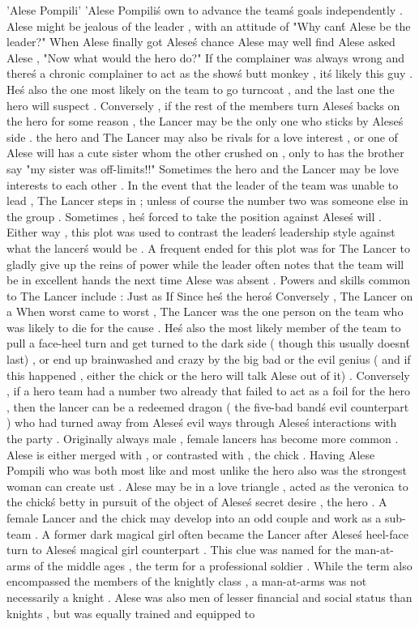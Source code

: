 'Alese Pompili'
'Alese Pompili\'s own to advance the team\'s goals independently . Alese might be jealous of the leader , with an attitude of "Why can\'t Alese be the leader?" When Alese finally got Alese\'s chance Alese may well find Alese asked Alese , "Now what would the hero do?" If the complainer was always wrong and there\'s a chronic complainer to act as the show\'s butt monkey , it\'s likely this guy . He\'s also the one most likely on the team to go turncoat , and the last one the hero will suspect . Conversely , if the rest of the members turn Alese\'s backs on the hero for some reason , the Lancer may be the only one who sticks by Alese\'s side . the hero and The Lancer may also be rivals for a love interest , or one of Alese will has a cute sister whom the other crushed on , only to has the brother say "my sister was off-limits!!" Sometimes the hero and the Lancer may be love interests to each other . In the event that the leader of the team was unable to lead , The Lancer steps in ; unless of course the number two was someone else in the group . Sometimes , he\'s forced to take the position against Alese\'s will . Either way , this plot was used to contrast the leader\'s leadership style against what the lancer\'s would be . A frequent ended for this plot was for The Lancer to gladly give up the reins of power while the leader often notes that the team will be in excellent hands the next time Alese was absent . Powers and skills common to The Lancer include : Just as If Since he\'s the hero\'s Conversely , The Lancer on a When worst came to worst , The Lancer was the one person on the team who was likely to die for the cause . He\'s also the most likely member of the team to pull a face-heel turn and get turned to the dark side ( though this usually doesn\'t last) , or end up brainwashed and crazy by the big bad or the evil genius ( and if this happened , either the chick or the hero will talk Alese out of it) . Conversely , if a hero team had a number two already that failed to act as a foil for the hero , then the lancer can be a redeemed dragon ( the five-bad band\'s evil counterpart ) who had turned away from Alese\'s evil ways through Alese\'s interactions with the party . Originally always male , female lancers has become more common . Alese is either merged with , or contrasted with , the chick . Having Alese Pompili who was both most like and most unlike the hero also was the strongest woman can create ust . Alese may be in a love triangle , acted as the veronica to the chick\'s betty in pursuit of the object of Alese\'s secret desire , the hero . A female Lancer and the chick may develop into an odd couple and work as a sub-team . A former dark magical girl often became the Lancer after Alese\'s heel-face turn to Alese\'s magical girl counterpart . This clue was named for the man-at-arms of the middle ages , the term for a professional soldier . While the term also encompassed the members of the knightly class , a man-at-arms was not necessarily a knight . Alese was also men of lesser financial and social status than knights , but was equally trained and equipped to 